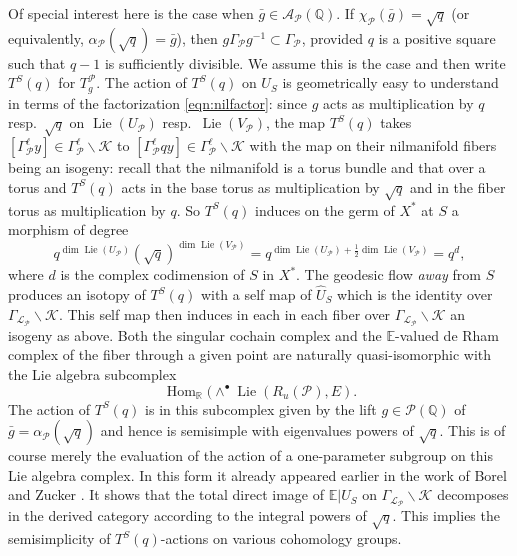 \documentclass[12pt,letterpaper]{amsart}
\numberwithin{equation}{section}
\def\EE{{\mathbb E}}
\def\QQ{{\mathbb Q}}
\def\RR{{\mathbb R}}
\def\G{\Gamma}
\def\bs{\backslash}
\def\Acal{{\mathcal A}}
\def\Kcal{{\mathcal K}}
\def\Lcal{{\mathcal L}}
\def\Pcal{{\mathcal P}}
\def\half{{\tfrac{1}{2}}}
\def\pt{{\scriptscriptstyle\bullet}}
\newcommand\Hom{\operatorname{Hom}}
\newcommand\lie{\operatorname{Lie}}
\theoremstyle{remark}
\begin{document}
Of special interest here is the case when 
$\bar g\in \Acal_\Pcal(\QQ)$.  If $\chi_\Pcal(\bar g)=\sqrt{q}$ (or equivalently, $\alpha_\Pcal(\sqrt{q})=\bar g$), then $g\G_\Pcal g^{-1}\subset\G_\Pcal$, provided $q$ is a  positive  square  such that  $q-1$ is sufficiently divisible.  We assume this is the case and then  write $T^S(q)$ for $T^\Pcal_g$. The  action of $T^S(q)$  on  $ U_S$ is geometrically easy to understand in terms of the 
factorization \eqref{eqn:nilfactor}: since $g$ acts as multiplication by $q$ resp.\  $\sqrt{q}$ on $\lie(U_\Pcal)$ resp.\  $\lie(V_\Pcal)$, the map $T^S(q)$
takes $[\G_\Pcal^\ell y]\in \G_\Pcal^\ell\bs\Kcal$ to $[\G_\Pcal^\ell qy]\in \G_\Pcal^\ell\bs\Kcal$ with the map on their nilmanifold fibers being an  isogeny: recall that  the nilmanifold is a torus bundle and that over a torus and $T^S(q)$ acts in the base torus as 
multiplication by $\sqrt{q}$ and in the fiber torus as  multiplication by $q$. So  $T^S(q)$ induces on the germ of $X^*$ at  $S$ a 
morphism of degree 
\[
q^{\dim\lie(U_\Pcal)} (\!\sqrt{q})^{\dim\lie(V_\Pcal)}=q^{\dim\lie(U_\Pcal)+\half\dim\lie(V_\Pcal)}=q^d,
\]
where $d$ is  the  complex codimension of $S$ in $X^*$. The  geodesic flow \emph{away} from $S$ produces an isotopy of $T^S(q)$ with  a self map of $\hat U_S$ which is the identity over $\G_{\Lcal_\Pcal}\bs\Kcal$. This self map then induces in each
in each fiber over $\G_{\Lcal_\Pcal}\bs\Kcal$ an isogeny as above.  Both the singular  cochain complex  and the $\EE$-valued de Rham complex of  the  fiber through a given point are naturally quasi-isomorphic  with the  Lie algebra  subcomplex  
\begin{equation}\label{eqn:}
\Hom_\RR( \wedge^\pt\lie(R_u(\Pcal), E).
\end{equation}
The action of $T^S(q)$  is in this subcomplex  given by the lift $g\in \Pcal(\QQ)$ of $\bar g=\alpha_\Pcal(\sqrt{q})$ and hence is semisimple with eigenvalues  powers of $\sqrt{q}$. This is of course merely the evaluation of the action of a one-parameter subgroup 
on this Lie algebra complex. In this form  it already appeared earlier in the work of Borel  \cite{bw} and  Zucker \cite{zucker:l2_ii}. 
It shows that the total direct image of $\EE|U_S$ on $\G_{\Lcal_\Pcal}\bs \Kcal$ decomposes in the derived category 
according to the integral powers of $\sqrt{q}$. This implies the semisimplicity of $T^S(q)$-actions on various cohomology groups. 
\end{document}
